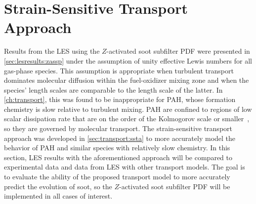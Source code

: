 \section{Strain-Sensitive Transport Approach}
\label{sec:lesresults:ssta}



Results from the LES using the $Z$-activated soot subfilter PDF were presented in \cref{sec:lesresults:zassp} under the assumption of unity effective Lewis numbers for all gas-phase species. This assumption is appropriate when turbulent transport dominates molecular diffusion within the fuel-oxidizer mixing zone and when the species' length scales are comparable to the length scale of the latter. In \cref{ch:transport}, this was found to be inappropriate for PAH, whose formation chemistry is slow relative to turbulent mixing. PAH are confined to regions of low scalar dissipation rate that are on the order of the Kolmogorov scale or smaller~\cite{vaishnavi2008}, so they are governed by molecular transport. The strain-sensitive transport approach was developed in \cref{sec:transport:ssta} to more accurately model the behavior of PAH and similar species with relatively slow chemistry. In this section, LES results with the aforementioned approach will be compared to experimental data and data from LES with other transport models. The goal is to evaluate the ability of the proposed transport model to more accurately predict the evolution of soot, so the $Z$-activated soot subfilter PDF will be implemented in all cases of interest.

